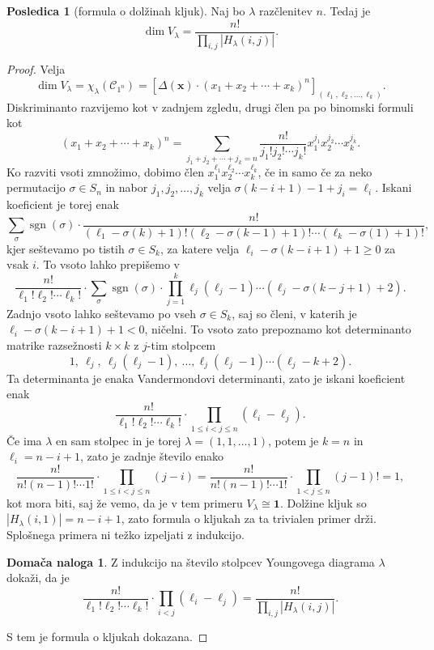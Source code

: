 \documentclass[11pt]{book}
\def\conclass{\mathcal{C}}
\def\11{\mathbf{1}}
\DeclareMathOperator\sgn{sgn}
\theoremstyle{definition}
\theoremstyle{zgled}
\theoremstyle{odprtproblem}
\theoremstyle{domacanaloga}
\newtheorem*{domacanaloga}{Domača naloga}
\newenvironment{dokaz}
    {\color{siva}\begin{proof}}
    {\end{proof}}
\theoremstyle{izrek}
\newtheorem*{posledica}{Posledica}
\begin{document}
\begin{posledica}[formula o dolžinah kljuk]
Naj bo $\lambda$ razčlenitev $n$. Tedaj je
\[
    \dim V_{\lambda} = \frac{n!}{\prod_{i,j} |H_{\lambda}(i,j)|}.
\]
\end{posledica}
\begin{dokaz}
Velja 
\[
    \dim V_{\lambda} = \chi_{\lambda}(\conclass_{1^n}) =
    \left[ \Delta(\mathbf{x}) \cdot (x_1 + x_2 + \cdots + x_k)^n \right]_{(\ell_1, \ell_2, \dots, \ell_k)}.
\]
Diskriminanto razvijemo kot v zadnjem zgledu, drugi člen pa po binomski formuli kot
\[
    (x_1 + x_2 + \cdots + x_k)^n = \sum_{j_1 + j_2 + \cdots + j_k = n} \frac{n!}{j_1! j_2! \cdots j_k!} x_1^{j_1} x_2^{j_2} \cdots x_k^{j_k}.
\]
Ko razviti vsoti zmnožimo, dobimo člen $x_1^{\ell_1} x_2^{\ell_2} \cdots x_k^{\ell_k}$, če in samo če za neko permutacijo $\sigma \in S_n$ in nabor $j_1, j_2, \dots, j_k$ velja $\sigma(k - i + 1) - 1 + j_i = \ell_i$. Iskani koeficient je torej enak
\[
    \sum_{\sigma} \sgn(\sigma) \cdot \frac{n!}{(\ell_1 - \sigma(k) + 1)! (\ell_2 - \sigma(k-1) + 1)! \cdots (\ell_k - \sigma(1) + 1)!},
\]
kjer seštevamo po tistih $\sigma \in S_k$, za katere velja $\ell_i - \sigma(k-i+1) + 1 \geq 0$ za vsak $i$. To vsoto lahko prepišemo v
\[
    \frac{n!}{\ell_1! \ell_2! \cdots \ell_k!} \cdot \sum_{\sigma} \sgn(\sigma) \cdot \prod_{j = 1}^k \ell_j (\ell_j - 1) \cdots (\ell_j - \sigma(k-j+1) + 2). 
\]
Zadnjo vsoto lahko seštevamo po vseh $\sigma \in S_k$, saj so členi, v katerih je $\ell_i - \sigma(k-i+1) + 1 < 0$, ničelni. To vsoto zato prepoznamo kot determinanto matrike razsežnosti $k \times k$ z $j$-tim stolpcem
\[
    1, \ \ell_j, \ \ell_j(\ell_j - 1), \ \dots, \ell_j(\ell_j - 1) \cdots (\ell_j - k + 2). 
\]
Ta determinanta je enaka Vandermondovi determinanti, zato je iskani koeficient enak
\[
    \frac{n!}{\ell_1! \ell_2! \cdots \ell_k!} \cdot \prod_{1 \leq i < j \leq n} (\ell_i - \ell_j).
\]
Če ima $\lambda$ en sam stolpec in je torej $\lambda = (1,1,\dots,1)$, potem je $k = n$ in $\ell_i = n - i + 1$, zato je zadnje število enako
\[
    \frac{n!}{n! (n-1)! \cdots 1!} \cdot \prod_{1 \leq i < j \leq n} (j-i) =
    \frac{n!}{n! (n-1)! \cdots 1!} \cdot \prod_{1 < j \leq n} (j-1)! =
    1,
\]
kot mora biti, saj že vemo, da je v tem primeru $V_{\lambda} \cong \11$. Dolžine kljuk so $|H_{\lambda}(i,1)| = n - i + 1$, zato formula o kljukah za ta trivialen primer drži. Splošnega primera ni težko izpeljati z indukcijo.

\begin{domacanaloga}
Z indukcijo na število stolpcev Youngovega diagrama $\lambda$ dokaži, da je
\[
    \frac{n!}{\ell_1! \ell_2! \cdots \ell_k!} \cdot \prod_{i < j} (\ell_i - \ell_j) = \frac{n!}{\prod_{i,j}|H_{\lambda}(i,j)|}.
\]
\end{domacanaloga}

S tem je formula o kljukah dokazana.
\end{dokaz}
\end{document}
